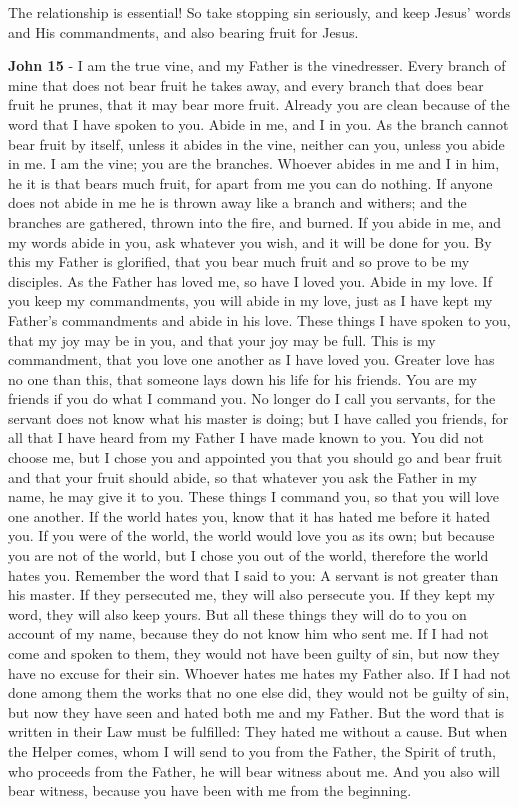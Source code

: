 \documentclass[11pt]{article}
\begin{document}
The relationship is essential!
So take stopping sin seriously, and keep Jesus' words and His commandments, and also bearing fruit for Jesus.

\textbf{John 15} - I am the true vine, and my Father is the vinedresser. Every branch of mine that does not bear fruit he takes away, and every branch that does bear fruit he prunes, that it may bear more fruit. Already you are clean because of the word that I have spoken to you. Abide in me, and I in you. As the branch cannot bear fruit by itself, unless it abides in the vine, neither can you, unless you abide in me. I am the vine; you are the branches. Whoever abides in me and I in him, he it is that bears much fruit, for apart from me you can do nothing. If anyone does not abide in me he is thrown away like a branch and withers; and the branches are gathered, thrown into the fire, and burned. If you abide in me, and my words abide in you, ask whatever you wish, and it will be done for you. By this my Father is glorified, that you bear much fruit and so prove to be my disciples. As the Father has loved me, so have I loved you. Abide in my love. If you keep my commandments, you will abide in my love, just as I have kept my Father's commandments and abide in his love. These things I have spoken to you, that my joy may be in you, and that your joy may be full. This is my commandment, that you love one another as I have loved you. Greater love has no one than this, that someone lays down his life for his friends. You are my friends if you do what I command you. No longer do I call you servants, for the servant does not know what his master is doing; but I have called you friends, for all that I have heard from my Father I have made known to you. You did not choose me, but I chose you and appointed you that you should go and bear fruit and that your fruit should abide, so that whatever you ask the Father in my name, he may give it to you. These things I command you, so that you will love one another. If the world hates you, know that it has hated me before it hated you. If you were of the world, the world would love you as its own; but because you are not of the world, but I chose you out of the world, therefore the world hates you. Remember the word that I said to you: A servant is not greater than his master. If they persecuted me, they will also persecute you. If they kept my word, they will also keep yours. But all these things they will do to you on account of my name, because they do not know him who sent me. If I had not come and spoken to them, they would not have been guilty of sin, but now they have no excuse for their sin. Whoever hates me hates my Father also. If I had not done among them the works that no one else did, they would not be guilty of sin, but now they have seen and hated both me and my Father. But the word that is written in their Law must be fulfilled: They hated me without a cause. But when the Helper comes, whom I will send to you from the Father, the Spirit of truth, who proceeds from the Father, he will bear witness about me. And you also will bear witness, because you have been with me from the beginning.
\end{document}
